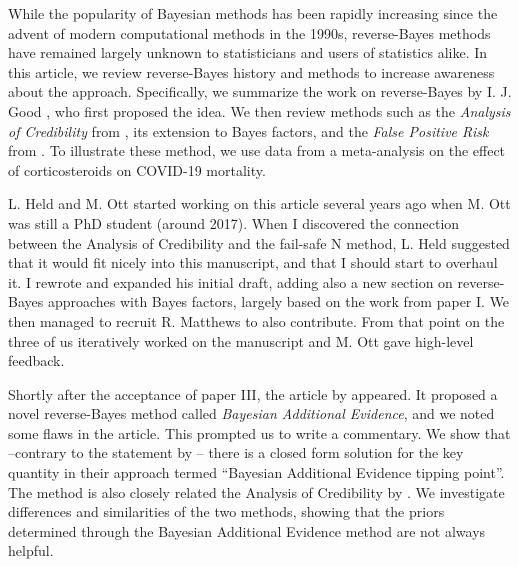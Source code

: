 
While the popularity of Bayesian methods has been rapidly increasing since the
advent of modern computational methods in the 1990s, reverse-Bayes methods %
have remained largely unknown to statisticians and users of statistics alike. In
this article, we review reverse-Bayes history and methods to increase awareness
about the approach. Specifically, we summarize the work on reverse-Bayes by I.
J. Good \citep{Good1950}, who first proposed the idea. We then review methods
such as the \emph{Analysis of Credibility} from \citet{Matthews2001b,
  Matthews2018}, its extension to Bayes factors, and the \emph{False Positive
  Risk} from \citet{Colquhoun2017}. To illustrate these method, we use data from
a meta-analysis on the effect of corticosteroids on COVID-19 mortality.

L. Held and M. Ott started working on this article several years ago when M. Ott
was still a PhD student (around 2017). When I discovered the connection between
the Analysis of Credibility and the fail-safe N method, L. Held suggested that
it would fit nicely into this manuscript, and that I should start to overhaul
it. I rewrote and expanded his initial draft, adding also a new section on
reverse-Bayes approaches with Bayes factors, largely based on the work from
paper I. We then managed to recruit R. Matthews to also contribute. From that
point on the three of us iteratively worked on the manuscript and M. Ott gave
high-level feedback.


Shortly after the acceptance of paper III, the article by \citet{Sondhi2021}
appeared. It proposed a novel reverse-Bayes method called \emph{Bayesian
  Additional Evidence}, and we noted some flaws in the article. This prompted us
to write a commentary. We show that --contrary to the statement by
\citet{Sondhi2021}-- there is a closed form solution for the key quantity in
their approach termed ``Bayesian Additional Evidence tipping point''.
The method is also closely related the Analysis of Credibility by
\citet{Matthews2018}. We investigate differences and similarities of the two
methods, showing that the priors determined through the Bayesian Additional
Evidence method are not always helpful.

